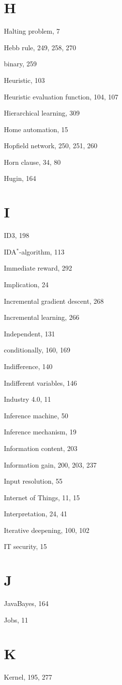 \documentclass[10pt]{book}
\begin{document}
\section{H}
Halting problem, 7

Hebb rule, 249, 258, 270

binary, 259

Heuristic, 103

Heuristic evaluation function, 104, 107

Hierarchical learning, 309

Home automation, 15

Hopfield network, 250, 251, 260

Horn clause, 34, 80

Hugin, 164

\section{I}
ID3, 198

IDA$^{\ast}$-algorithm, 113

Immediate reward, 292

Implication, 24

Incremental gradient descent, 268

Incremental learning, 266

Independent, 131

conditionally, 160, 169

Indifference, 140

Indifferent variables, 146

Industry 4.0, 11

Inference machine, 50

Inference mechanism, 19

Information content, 203

Information gain, 200, 203, 237

Input resolution, 55

Internet of Things, 11, 15

Interpretation, 24, 41

Iterative deepening, 100, 102

IT security, 15

\section{J}
JavaBayes, 164

Jobs, 11

\section{K}
Kernel, 195, 277
\end{document}
